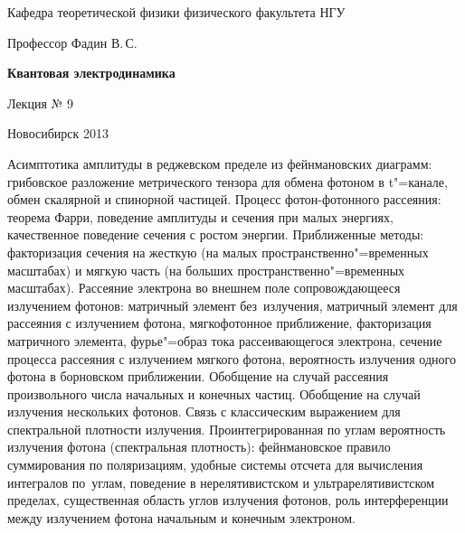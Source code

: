 \documentclass[12pt,pagesize,paper=192mm:108mm]{scrbook}
\begin{document}
\begin{titlepage}
\begin{center}
    Кафедра теоретической физики физического факультета НГУ
    \medskip

    \Large
    Профессор Фадин В.\,С.
    \bigskip

    \huge
    \textbf{Квантовая электродинамика}
    \bigskip

    \Large
    Лекция № 9
    \vfill

    \normalsize
    \vfill

    \normalsize \ccbysa\hspace{0.5em}  Новосибирск 2013
  \end{center}
\end{titlepage}
\vspace*{-1em}
\begin{center}
\vfill
  \begin{minipage}{0.9\linewidth}
    Асимптотика амплитуды в реджевском пределе из фейнмановских
    диаграмм: грибовское разложение метрического тензора для обмена
    фотоном в t"=канале, обмен скалярной и спинорной частицей. Процесс
    фотон-фотонного рассеяния: теорема Фарри, поведение амплитуды и
    сечения при малых энергиях, качественное поведение сечения с
    ростом энергии. Приближенные методы: факторизация сечения на
    жесткую (на малых пространственно"=временных масштабах) и мягкую
    часть (на больших пространственно"=временных масштабах). Рассеяние
    электрона во внешнем поле сопровождающееся излучением фотонов:
    матричный элемент без~излучения, матричный элемент для рассеяния с
    излучением фотона, мягкофотонное приближение, факторизация
    матричного элемента, фурье"=образ тока рассеивающегося электрона,
    сечение процесса рассеяния с излучением мягкого фотона,
    вероятность излучения одного фотона в борновском
    приближении. Обобщение на случай рассеяния произвольного числа
    начальных и конечных частиц. Обобщение на случай излучения
    нескольких фотонов. Связь с классическим выражением для
    спектральной плотности излучения. Проинтегрированная по углам
    вероятность излучения фотона (спектральная плотность):
    фейнмановское правило суммирования по поляризациям, удобные
    системы отсчета для вычисления интегралов по~углам, поведение в
    нерелятивистском и ультрарелятивистском пределах, существенная
    область углов излучения фотонов, роль интерференции между
    излучением фотона начальным и конечным электроном.
  \end{minipage}
  \vfill

\end{center}
\end{document}
